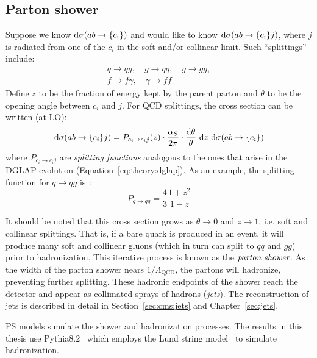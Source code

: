\subsection{Parton shower}
\label{sec:theory:ps}
Suppose we know $\mathrm{d}\sigma(ab\rightarrow \{c_i\})$ and would like to know $\mathrm{d}\sigma(ab\rightarrow\{c_i\}j)$, where $j$ is radiated from one of the $c_i$ in the soft and/or collinear limit.
Such ``splittings'' include:
\begin{gather}
    q\rightarrow qg, \quad g\rightarrow qq, \quad g\rightarrow gg, \nonumber \\ 
        f\rightarrow f\gamma, \quad \gamma\rightarrow ff 
\end{gather}
Define $z$ to be the fraction of energy kept by the parent parton and $\theta$ to be the opening angle between $c_i$ and $j$. 
For QCD splittings, the cross section can be written (at LO):
\begin{equation}
    \mathrm{d}\sigma(ab\rightarrow\{c_i\}j) =
        P_{c_i \rightarrow c_i j} (z) 
        \cdot \frac{\alpha_S}{2\pi} 
        \cdot \frac{\mathrm{d}\theta}{\theta} 
        ~\mathrm{d} z
        ~\mathrm{d}\sigma(ab\rightarrow\{c_i\})
\end{equation}
where $P_{c_i\rightarrow c_i j}$ are \emph{splitting functions} analogous to the ones that arise in the DGLAP evolution (Equation~\ref{eq:theory:dglap}).
As an example, the splitting function for $q\rightarrow qg$ is~\cite{pythia}:
\begin{equation}
    P_{q\rightarrow qg} = \frac{4}{3} \frac{1+z^2}{1-z}
\end{equation}

It should be noted that this cross section grows as $\theta\rightarrow 0$ and $z\rightarrow 1$, i.e. soft and collinear splittings.
That is, if a bare quark is produced in an event, it will produce many soft and collinear gluons (which in turn can split to $qq$ and $gg$) prior to hadronization.
This iterative process is known as the $\emph{parton shower}$.
As the width of the parton shower nears $1/\Lambda_\mathrm{QCD}$, the partons will hadronize, preventing further splitting.
These hadronic endpoints of the shower reach the detector and appear as collimated sprays of hadrons (\emph{jets}).
The reconstruction of jets is described in detail in Section~\ref{sec:cms:jets} and Chapter~\ref{sec:jets}. 

PS models simulate the shower and hadronization processes.
The results in this thesis use Pythia8.2~\cite{pythia} which employs the Lund string model~\cite{lund} to simulate hadronization.
